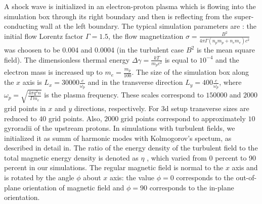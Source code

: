 \documentclass[a4paper]{jpconf}
\begin{document}
	A shock wave is initialized in an electron-proton plasma which is flowing into the simulation box through its right boundary and then is reflecting from the super-conducting wall at the left boundary.  The typical simulation parameters are : the initial flow Lorentz factor $\Gamma = 1.5$, the flow magnetization $\sigma = \frac{B^2}{4\pi\Gamma (n_p m_p + n_e m_e) c^2}$ was choosen to be  0.004 and 0.0004  (in the turbulent case $B^2$ is the mean square field). The dimensionless thermal energy $\Delta \gamma = \frac{k T}{m_p c^2}$ is equal to $10^{-4}$ and the electron mass is increased up to $m_e = \frac{m_p}{100}$. The size of the simulation box along the $x$ axis is $L_x = 30000\frac{c}{\omega_p}$ and in the transverse direction $L_y = 400\frac{c}{\omega_p}$, where $\omega_p = \sqrt{\frac{4\pi q^2 n}{\Gamma m_e}}$ is the plasma frequency. These scales correspond to $150000$ and $2000$ grid points in $x$ and $y$ directions, respectively. For 3d setup transverse sizes are reduced to $40$ grid points. Also, $2000$ grid points correspond to approximately $10$ gyroradii of the upstream protons.
	In simulations with turbulent fields, we initialized it as  summ of harmonic modes with Kolmogorov's spectum, as described in detail in\cite{Romansky2019}. The ratio of the energy density of the turbulent field to the total magnetic energy density is denoted as $\eta$ , which varied from 0 percent to 90 percent in our simulations. The regular magnetic field is normal to the $x$ axis and is rotated by the angle $\phi$ about $x$ axis: the value $\phi = 0$ corresponds to the out-of-plane orientation of magnetic field and $\phi = 90$ corresponds to the in-plane orientation.
	
	
	
\end{document}
